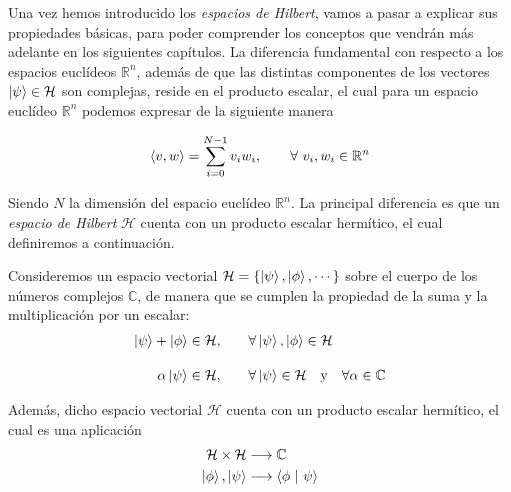 \documentclass{article}
\numberwithin{equation}{section} %
\begin{document}
    \vspace{5mm}

    Una vez hemos introducido los \textit{espacios de Hilbert}, vamos a pasar a explicar sus propiedades básicas, para poder comprender los conceptos que vendrán más adelante en los siguientes capítulos. La diferencia fundamental con respecto a los espacios euclídeos \( \mathbb{R}^{n} \), además de que las distintas componentes de los vectores \( \ket{\psi} \in \mathcal{H} \) son complejas, reside en el producto escalar, el cual para un espacio euclídeo \( \mathbb{R}^{n} \) podemos expresar de la siguiente manera

    \begin{equation*}
        \braket{v, w} = \sum_{i = 0}^{N - 1} v_{i} w_{i}, \qquad \forall \ v_{i}, w_{i} \in \mathbb{R}^{n}
    \end{equation*}

    \vspace{2.5mm}

    Siendo \( N \) la dimensión del espacio euclídeo \( \mathbb{R}^{n} \). La principal diferencia es que un \textit{espacio de Hilbert} \( \mathcal{H} \) cuenta con un producto escalar hermítico, el cual definiremos a continuación.

    \vspace{5mm}

    Consideremos un espacio vectorial \( \mathcal{H} = \{ \ket{\psi}, \ket{\phi}, \cdots \} \) sobre el cuerpo de los números complejos \( \mathbb{C} \), de manera que se cumplen la propiedad de la suma y la multiplicación por un escalar:
    \begin{align*}
        \ket{\psi} + \ket{\phi} \in \mathcal{H}, \qquad &\forall \ket{\psi}, \ket{\phi} \in \mathcal{H}\\[10pt]
        \alpha \ket{\psi} \in \mathcal{H}, \qquad &\forall \ket{\psi} \in \mathcal{H} \quad \text{y} \quad \forall \alpha \in \mathbb{C}
    \end{align*}

    \vspace{1.5mm}

    Además, dicho espacio vectorial \( \mathcal{H} \) cuenta con un producto escalar hermítico, el cual es una aplicación
    \begin{align*}
        \mathcal{H} \times \mathcal{H} &\longrightarrow \mathbb{C} \\
        \ket{\phi}, \ket{\psi} &\longrightarrow \braket{\phi \ | \ \psi}
    \end{align*}
\end{document}
